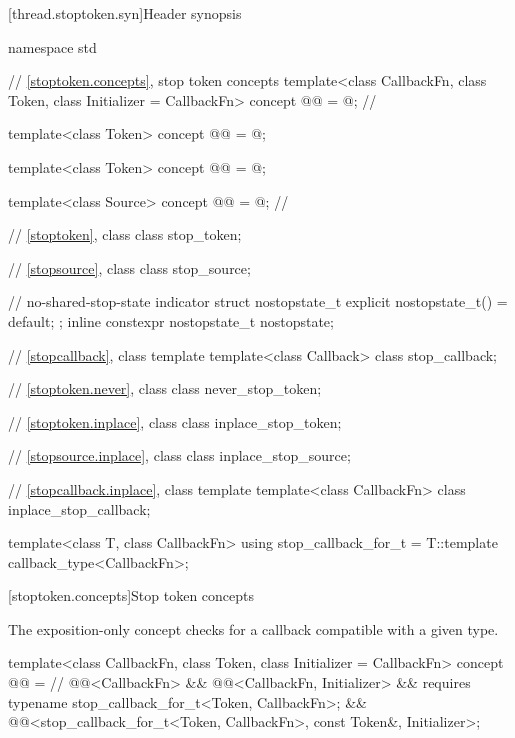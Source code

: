 [thread.stoptoken.syn]{Header  synopsis}

%
\begin{codeblock}
namespace std {
  // \ref{stoptoken.concepts}, stop token concepts
  template<class CallbackFn, class Token, class Initializer = CallbackFn>
    concept @@ = @\seebelow@;           // \expos

  template<class Token>
    concept @@ = @\seebelow@;

  template<class Token>
    concept @@ = @\seebelow@;

  template<class Source>
    concept @@ = @\seebelow@;                 // \expos

  // \ref{stoptoken}, class 
  class stop_token;

  // \ref{stopsource}, class 
  class stop_source;

  // no-shared-stop-state indicator
  struct nostopstate_t {
    explicit nostopstate_t() = default;
  };
  inline constexpr nostopstate_t nostopstate{};

  // \ref{stopcallback}, class template 
  template<class Callback>
    class stop_callback;

  // \ref{stoptoken.never}, class 
  class never_stop_token;

  // \ref{stoptoken.inplace}, class 
  class inplace_stop_token;

  // \ref{stopsource.inplace}, class 
  class inplace_stop_source;

  // \ref{stopcallback.inplace}, class template 
  template<class CallbackFn>
    class inplace_stop_callback;

  template<class T, class CallbackFn>
    using stop_callback_for_t = T::template callback_type<CallbackFn>;
}
\end{codeblock}

[stoptoken.concepts]{Stop token concepts}

\pnum
The exposition-only  concept
checks for a callback compatible with a given  type.
\begin{codeblock}
template<class CallbackFn, class Token, class Initializer = CallbackFn>
  concept @@ =                          // \expos
    @@<CallbackFn> &&
    @@<CallbackFn, Initializer> &&
    requires { typename stop_callback_for_t<Token, CallbackFn>; } &&
    @@<stop_callback_for_t<Token, CallbackFn>, const Token&, Initializer>;
\end{codeblock}

